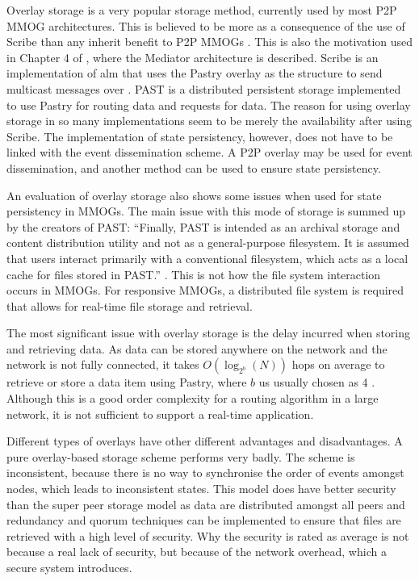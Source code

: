 \documentclass[journal,oneside,a4paper,onecolumn]{IEEEtran}
\begin{document}
Overlay storage is a very popular storage method, currently used by most P2P MMOG architectures. This is believed to be more as a consequence of the use of Scribe than any inherit benefit to P2P MMOGs \cite{past_storage_focus}. This is also the motivation used in Chapter 4 of \cite{Fan_phd}, where the Mediator architecture is described. Scribe is an implementation of \ac{alm} that uses the Pastry overlay as the structure to send multicast messages over \cite{scribe}. PAST is a distributed persistent storage implemented to use Pastry for routing data and requests for data. The reason for using overlay storage in so many implementations seem to be merely the availability after using Scribe. The implementation of state persistency, however, does not have to be linked with the event dissemination scheme. A P2P overlay may be used for event dissemination, and another method can be used to ensure state persistency.

An evaluation of overlay storage also shows some issues when used for state persistency in MMOGs. The main issue with this mode of storage is summed up by the creators of PAST: ``Finally, PAST is intended as an archival storage and content distribution utility and not as a general-purpose filesystem. It is assumed that users interact primarily with a conventional filesystem, which acts as a local cache for files stored in PAST.'' \cite{storage_and_chaching_PAST}. This is not how the file system interaction occurs in MMOGs. For responsive MMOGs, a distributed file system is required that allows for real-time file storage and retrieval.

The most significant issue with overlay storage is the delay incurred when storing and retrieving data. As data can be stored anywhere on the network and the network is not fully connected, it takes $O(\log_{2^b}(N))$ hops on average to retrieve or store a data item using Pastry, where $b$ us usually chosen as 4 \cite{storage_and_chaching_PAST}. Although this is a good order complexity for a routing algorithm in a large network, it is not sufficient to support a real-time application.

Different types of overlays have other different advantages and disadvantages. A pure overlay-based storage scheme performs very badly. The scheme is inconsistent, because there is no way to synchronise the order of events amongst nodes, which leads to inconsistent states. This model does have better security than the super peer storage model as data are distributed amongst all peers and redundancy and quorum techniques can be implemented to ensure that files are retrieved with a high level of security. Why the security is rated as average is not because a real lack of security, but because of the network overhead, which a secure system introduces.
\end{document}
